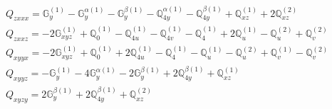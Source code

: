 \documentclass[fleqn,8pt,landscape]{jsarticle}
\begin{document}
\begin{align*}
& Q_{zxxx} = \mathbb{G}_{y}^{(1)} - \mathbb{G}_{y}^{\alpha(1)} - \mathbb{G}_{y}^{\beta(1)} - \mathbb{Q}_{4y}^{\alpha(1)} - \mathbb{Q}_{4y}^{\beta(1)} + \mathbb{Q}_{xz}^{(1)} + 2 \mathbb{Q}_{xz}^{(2)} \\
& Q_{zxxz} = - 2 \mathbb{G}_{xyz}^{(1)} + \mathbb{Q}_{0}^{(1)} - \mathbb{Q}_{4u}^{(1)} - \mathbb{Q}_{4v}^{(1)} - \mathbb{Q}_{4}^{(1)} + 2 \mathbb{Q}_{u}^{(1)} - \mathbb{Q}_{u}^{(2)} + \mathbb{Q}_{v}^{(2)} \\
& Q_{xyyx} = - 2 \mathbb{G}_{xyz}^{(1)} + \mathbb{Q}_{0}^{(1)} + 2 \mathbb{Q}_{4u}^{(1)} - \mathbb{Q}_{4}^{(1)} - \mathbb{Q}_{u}^{(1)} - \mathbb{Q}_{u}^{(2)} + \mathbb{Q}_{v}^{(1)} - \mathbb{Q}_{v}^{(2)} \\
& Q_{xyyz} = - \mathbb{G}_{y}^{(1)} - 4 \mathbb{G}_{y}^{\alpha(1)} - 2 \mathbb{G}_{y}^{\beta(1)} + 2 \mathbb{Q}_{4y}^{\beta(1)} + \mathbb{Q}_{xz}^{(1)} \\
& Q_{xyzy} = 2 \mathbb{G}_{y}^{\beta(1)} + 2 \mathbb{Q}_{4y}^{\beta(1)} + \mathbb{Q}_{xz}^{(2)}
\end{align*}
\end{document}
